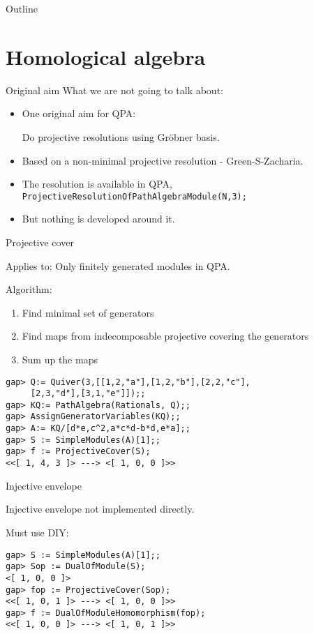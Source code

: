 \begin{frame}{Outline}
  \tableofcontents
\end{frame}

\section{Homological algebra}

\begin{frame}{Original aim}
What we are not going to talk about:
\begin{itemize}
\item One original aim for QPA: \parbox[t]{5cm}{Do projective resolutions
    using Gr\"obner basis.}
\pause
\item Based on a non-minimal projective resolution - Green-S-Zacharia.
\item The resolution is available in QPA, \\
          \texttt{ProjectiveResolutionOfPathAlgebraModule(N,3);}
\pause
\item But nothing is developed around it. 
\end{itemize}
\end{frame}

\begin{frame}[fragile]{Projective cover}

Applies to: Only finitely generated modules in QPA.\medskip

Algorithm:

\begin{enumerate}[\rm(1)] 
\item Find minimal set of generators
\item Find maps from indecomposable projective covering the generators
\item Sum up the maps
\end{enumerate}
\pause 
\begin{verbatim}
gap> Q:= Quiver(3,[[1,2,"a"],[1,2,"b"],[2,2,"c"],
     [2,3,"d"],[3,1,"e"]]);;
gap> KQ:= PathAlgebra(Rationals, Q);;
gap> AssignGeneratorVariables(KQ);;
gap> A:= KQ/[d*e,c^2,a*c*d-b*d,e*a];;
gap> S := SimpleModules(A)[1];;
gap> f := ProjectiveCover(S);
<<[ 1, 4, 3 ]> ---> <[ 1, 0, 0 ]>>
\end{verbatim}

\end{frame}

\begin{frame}[fragile]{Injective envelope}

Injective envelope not implemented directly.\medskip 

Must use DIY:

\begin{verbatim}
gap> S := SimpleModules(A)[1];;
gap> Sop := DualOfModule(S);
<[ 1, 0, 0 ]>
gap> fop := ProjectiveCover(Sop);
<<[ 1, 0, 1 ]> ---> <[ 1, 0, 0 ]>>
gap> f := DualOfModuleHomomorphism(fop);
<<[ 1, 0, 0 ]> ---> <[ 1, 0, 1 ]>>
\end{verbatim}
\end{frame}

